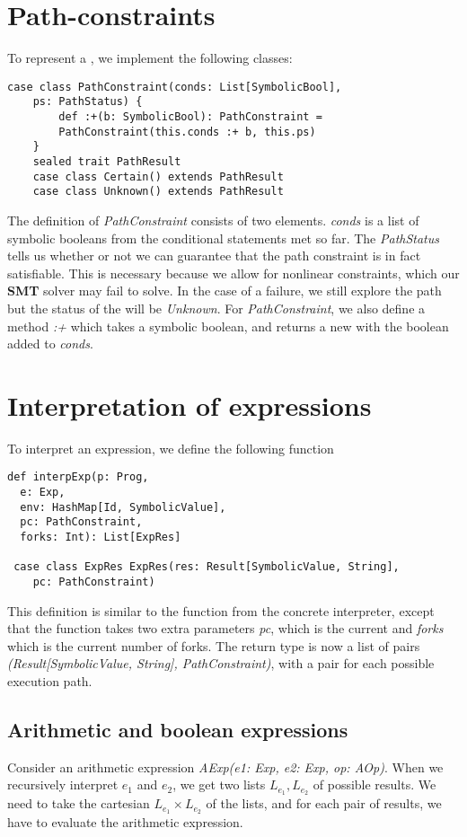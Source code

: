 \section{Path-constraints}
To represent a \pc, we implement the following classes:

\begin{lstlisting}[style=simple]
case class PathConstraint(conds: List[SymbolicBool],
	ps: PathStatus) {
		def :+(b: SymbolicBool): PathConstraint = 
		PathConstraint(this.conds :+ b, this.ps)
	}
	sealed trait PathResult
	case class Certain() extends PathResult
	case class Unknown() extends PathResult
\end{lstlisting}

The definition of \textsl{PathConstraint} consists of two elements. \textsl{conds} is a  list of symbolic booleans from the conditional statements met so far. The \textsl{PathStatus} tells us whether or not we can guarantee that the path constraint is in fact satisfiable. This is necessary because we allow for nonlinear constraints, which our \textbf{SMT} solver may fail to solve. In the case of a failure, we still explore the path but the status of the \pc will be \textsl{Unknown}. For \textsl{PathConstraint}, we also define a method \textsl{:+} which takes a symbolic boolean, and returns a new \pc with the boolean added to \textsl{conds}. 

\section{Interpretation of expressions}
To interpret an expression, we define the following function

\begin{lstlisting}[style = simple]
 def interpExp(p: Prog,
  e: Exp, 
  env: HashMap[Id, SymbolicValue],
  pc: PathConstraint, 
  forks: Int): List[ExpRes]
  
 case class ExpRes ExpRes(res: Result[SymbolicValue, String], 
 	pc: PathConstraint)
\end{lstlisting}
This definition is similar to the function from the concrete interpreter, except that the function takes two extra parameters \textsl{pc}, which is the current \pc and \textsl{forks} which is the current number of forks. The return type is now a list of pairs \textsl{(Result[SymbolicValue, String], PathConstraint)}, with a pair for each possible execution path. 
\subsection{Arithmetic and boolean expressions}
Consider an arithmetic expression 
\textsl{AExp(e1: Exp, e2: Exp, op: AOp)}. When we recursively interpret $e_1$ and $e_2$, we get two lists $L_{e_1}, L_{e_2}$ of possible results. We need to take the cartesian $L_{e_1} \times L_{e_2}$ of the lists, and for each pair of results, we have to evaluate the arithmetic expression. 

